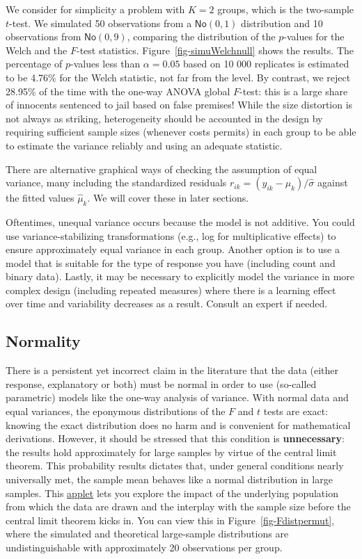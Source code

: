 \documentclass[
  11pt,
  letterpaper,
]{scrbook}
\theoremstyle{definition}
\theoremstyle{remark}
\begin{document}
We consider for simplicity a problem with \(K=2\) groups, which is the
two-sample \(t\)-test. We simulated 50 observations from a
\(\mathsf{No}(0, 1)\) distribution and 10 observations from
\(\mathsf{No}(0, 9)\), comparing the distribution of the \(p\)-values
for the Welch and the \(F\)-test statistics.
Figure~\ref{fig-simuWelchnull} shows the results. The percentage of
\(p\)-values less than \(\alpha=0.05\) based on 10 000 replicates is
estimated to be 4.76\% for the Welch statistic, not far from the level.
By contrast, we reject 28.95\% of the time with the one-way ANOVA global
\(F\)-test: this is a large share of innocents sentenced to jail based
on false premises! While the size distortion is not always as striking,
heterogeneity should be accounted in the design by requiring sufficient
sample sizes (whenever costs permits) in each group to be able to
estimate the variance reliably and using an adequate statistic.

There are alternative graphical ways of checking the assumption of equal
variance, many including the standardized residuals
\(r_{ik} = (y_{ik} - \widehat{\mu}_k)/\widehat{\sigma}\) against the
fitted values \(\widehat{\mu}_k\). We will cover these in later
sections.

Oftentimes, unequal variance occurs because the model is not additive.
You could use variance-stabilizing transformations (e.g., log for
multiplicative effects) to ensure approximately equal variance in each
group. Another option is to use a model that is suitable for the type of
response you have (including count and binary data). Lastly, it may be
necessary to explicitly model the variance in more complex design
(including repeated measures) where there is a learning effect over time
and variability decreases as a result. Consult an expert if needed.

\hypertarget{normality}{%
\subsection{Normality}\label{normality}}

There is a persistent yet incorrect claim in the literature that the
data (either response, explanatory or both) must be normal in order to
use (so-called parametric) models like the one-way analysis of variance.
With normal data and equal variances, the eponymous distributions of the
\(F\) and \(t\) tests are exact: knowing the exact distribution does no
harm and is convenient for mathematical derivations. However, it should
be stressed that this condition is \textbf{unnecessary}: the results
hold approximately for large samples by virtue of the central limit
theorem. This probability results dictates that, under general
conditions nearly universally met, the sample mean behaves like a normal
distribution in large samples. This
\href{http://195.134.76.37/applets/AppletCentralLimit/Appl_CentralLimit2.html}{applet}
lets you explore the impact of the underlying population from which the
data are drawn and the interplay with the sample size before the central
limit theorem kicks in. You can view this in
Figure~\ref{fig-Fdistpermut}, where the simulated and theoretical
large-sample distributions are undistinguishable with approximately 20
observations per group.
\end{document}
